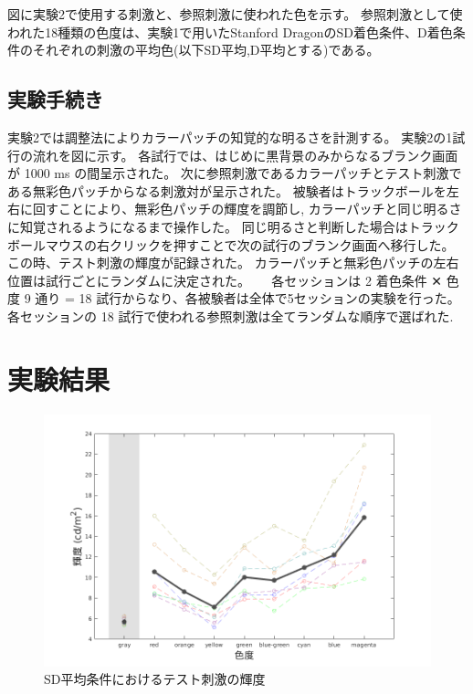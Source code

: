         図に実験2で使用する刺激と、参照刺激に使われた色を示す。
        参照刺激として使われた18種類の色度は、実験1で用いたStanford DragonのSD着色条件、D着色条件のそれぞれの刺激の平均色(以下SD平均,D平均とする)である。

    \subsection{実験手続き}

        実験2では調整法によりカラーパッチの知覚的な明るさを計測する。
        実験2の1試行の流れを図に示す。
        各試行では、はじめに黒背景のみからなるブランク画面が 1000 ms の間呈示された。
        次に参照刺激であるカラーパッチとテスト刺激である無彩色パッチからなる刺激対が呈示された。
        被験者はトラックボールを左右に回すことにより、無彩色パッチの輝度を調節し, カラーパッチと同じ明るさに知覚されるようになるまで操作した。
        同じ明るさと判断した場合はトラックボールマウスの右クリックを押すことで次の試行のブランク画面へ移行した。
        この時、テスト刺激の輝度が記録された。
        カラーパッチと無彩色パッチの左右位置は試行ごとにランダムに決定された。
        　
        各セッションは 2 着色条件 ✕ 色度 9 通り = 18 試行からなり、各被験者は全体で5セッションの実験を行った。
        各セッションの 18 試行で使われる参照刺激は全てランダムな順序で選ばれた.

\section{実験結果}

    \begin{figure}[h]
        \centering
        \includegraphics[width=14.0cm]{./img/ex2_res_SD_p.png}
        \caption{SD平均条件におけるテスト刺激の輝度}
        \label{ex2_SD}
    \end{figure}

